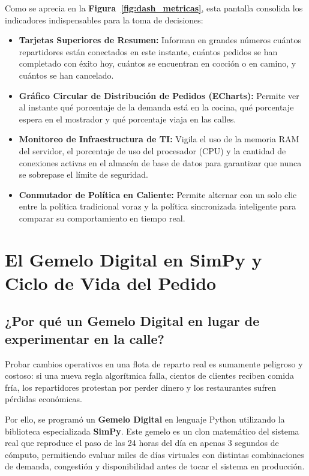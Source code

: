\documentclass[11pt,a4paper]{article}
\begin{document}
Como se aprecia en la \textbf{Figura~\ref{fig:dash_metricas}}, esta pantalla consolida los indicadores indispensables para la toma de decisiones:
\begin{itemize}[leftmargin=*]
    \item \textbf{Tarjetas Superiores de Resumen:} Informan en grandes números cuántos repartidores están conectados en este instante, cuántos pedidos se han completado con éxito hoy, cuántos se encuentran en cocción o en camino, y cuántos se han cancelado.
    \item \textbf{Gráfico Circular de Distribución de Pedidos (ECharts):} Permite ver al instante qué porcentaje de la demanda está en la cocina, qué porcentaje espera en el mostrador y qué porcentaje viaja en las calles.
    \item \textbf{Monitoreo de Infraestructura de TI:} Vigila el uso de la memoria RAM del servidor, el porcentaje de uso del procesador (CPU) y la cantidad de conexiones activas en el almacén de base de datos para garantizar que nunca se sobrepase el límite de seguridad.
    \item \textbf{Conmutador de Política en Caliente:} Permite alternar con un solo clic entre la política tradicional voraz y la política sincronizada inteligente para comparar su comportamiento en tiempo real.
\end{itemize}

\section{El Gemelo Digital en SimPy y Ciclo de Vida del Pedido}

\subsection{¿Por qué un Gemelo Digital en lugar de experimentar en la calle?}
Probar cambios operativos en una flota de reparto real es sumamente peligroso y costoso: si una nueva regla algorítmica falla, cientos de clientes reciben comida fría, los repartidores protestan por perder dinero y los restaurantes sufren pérdidas económicas.

Por ello, se programó un \textbf{Gemelo Digital} en lenguaje Python utilizando la biblioteca especializada \textbf{SimPy}. Este gemelo es un clon matemático del sistema real que reproduce el paso de las 24 horas del día en apenas 3 segundos de cómputo, permitiendo evaluar miles de días virtuales con distintas combinaciones de demanda, congestión y disponibilidad antes de tocar el sistema en producción.
\end{document}
